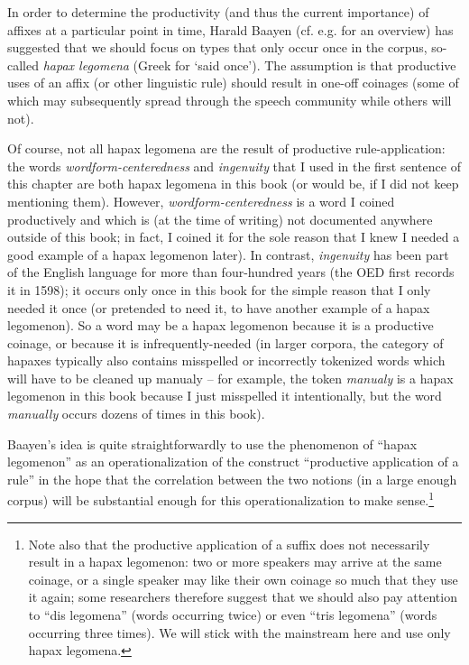 In order to determine the productivity (and thus the current importance) of affixes at a particular point in time, Harald Baayen (cf. e.g. \citet{baayen_41._2009} for an overview) has suggested that we should focus on types that only occur once in the corpus, so-called \textit{hapax legomena} (Greek for `said once'). The assumption is that productive uses of an affix (or other linguistic rule) should result in one-off coinages (some of which may subsequently spread through the speech community while others will not).

Of course, not all hapax legomena are the result of productive rule-application: the words \textit{wordform-centeredness} and \textit{ingenuity} that I used in the first sentence of this chapter are both hapax legomena in this book (or would be, if I did not keep mentioning them). However, \textit{wordform-centeredness} is a word I coined productively and which is (at the time of writing) not documented anywhere outside of this book; in fact, I coined it for the sole reason that I knew I needed a good example of a hapax legomenon later). In contrast, \textit{ingenuity} has been part of the English language for more than four-hundred years (the OED first records it in 1598); it occurs only once in this book for the simple reason that I only needed it once (or pretended to need it, to have another example of a hapax legomenon). So a word may be a hapax legomenon because it is a productive coinage, or because it is infrequently-needed (in larger corpora, the category of hapaxes typically also contains misspelled or incorrectly tokenized words which will have to be cleaned up manualy -- for example, the token \textit{manualy} is a hapax legomenon in this book because I just misspelled it intentionally, but the word \textit{manually} occurs dozens of times in this book).

Baayen's idea is quite straightforwardly to use the phenomenon of ``hapax legomenon'' as an operationalization of the construct ``productive application of a rule'' in the hope that the correlation between the two notions (in a large enough corpus) will be substantial enough for this operationalization to make sense.\footnote{Note also that the productive application of a suffix does not necessarily result in a hapax legomenon: two or more speakers may arrive at the same coinage, or a single speaker may like their own coinage so much that they use it again; some researchers therefore suggest that we should also pay attention to ``dis legomena'' (words occurring twice) or even ``tris legomena'' (words occurring three times). We will stick with the mainstream here and use only hapax legomena.}

